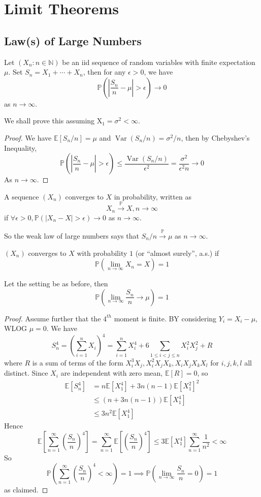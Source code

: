 \section{Limit Theorems}
\subsection{Law(s) of Large Numbers}
\begin{theorem}
    Let $(X_n:n\in\mathbb N)$ be an iid sequence of random variables with finite expectation $\mu$.
    Set $S_n=X_1+\cdots+X_n$, then for any $\epsilon>0$, we have
    $$\mathbb P\left( \left|\frac{S_n}{n}-\mu\right|>\epsilon \right)\to 0$$
    as $n\to\infty$.
\end{theorem}
We shall prove this assuming $\operatorname{X_1}=\sigma^2<\infty$.
\begin{proof}
    We have $\mathbb E[S_n/n]=\mu$ and $\operatorname{Var}(S_n/n)=\sigma^2/n$, then by Chebyshev's Inequality,
    $$\mathbb P\left(\left|\frac{S_n}{n}-\mu\right|>\epsilon\right)\le\frac{\operatorname{Var}(S_n/n)}{\epsilon^2}=\frac{\sigma^2}{\epsilon^2n}\to 0$$
    As $n\to\infty$.
\end{proof}
\begin{definition}
    A sequence $(X_n)$ converges to $X$ in probability, written as
    $$X_n\xrightarrow{\mathbb P}X,n\to\infty$$
    if $\forall\epsilon>0,\mathbb P(|X_n-X|>\epsilon)\to 0$ as $n\to\infty$.
\end{definition}
So the weak law of large numbers says that $S_n/n\xrightarrow{\mathbb P}\mu$ as $n\to\infty$.
\begin{definition}
    $(X_n)$ converges to $X$ with probability $1$ (or ``almost surely'', a.s.) if
    $$\mathbb P\left(\lim_{n\to\infty}X_n=X\right)=1$$
\end{definition}
\begin{theorem}
    Let the setting be as before, then
    $$\mathbb P\left(\lim_{n\to\infty}\frac{S_n}{n}\to\mu\right)=1$$
\end{theorem}
\begin{proof}
    Assume further that the $4^{th}$ moment is finite.
    BY considering $Y_i=X_i-\mu$, WLOG $\mu=0$.
    We have
    $$S_n^4=\left( \sum_{i=1}^nX_i \right)^4=\sum_{i=1}^nX_i^4+6\sum_{1\le i<j\le n}X_i^2X_j^2+R$$
    where $R$ is a sum of terms of the form $X_i^3X_j,X_i^2X_jX_k,X_iX_jX_kX_l$ for $i,j,k,l$ all distinct.
    Since $X_i$ are independent with zero mean, $\mathbb E[R]=0$, so
    \begin{align*}
        \mathbb E[S_n^4]&=n\mathbb E[X_1^4]+3n(n-1)\mathbb E[X_1^2]^2\\
        &\le (n+3n(n-1))\mathbb E[X_1^4]\\
        &\le 3n^2\mathbb E[X_1^4]
    \end{align*}
    Hence
    $$\mathbb E\left[ \sum_{n=1}^\infty\left( \frac{S_n}{n} \right)^4 \right]=\sum_{n=1}^\infty\mathbb E\left[ \left( \frac{S_n}{n} \right)^4 \right]\le 3\mathbb E[X_1^4]\sum_{n=1}^\infty\frac{1}{n^2}<\infty$$
    So
    $$\mathbb P\left(\sum_{n=1}^\infty\left( \frac{S_n}{n} \right)^4<\infty\right)=1\implies\mathbb P\left(\lim_{n\to\infty}\frac{S_n}{n}=0\right)=1$$
    as claimed.
\end{proof}
